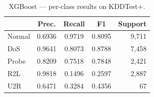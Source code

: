 \documentclass[conference, twocolumn]{IEEEtran}
\begin{document}
\begin{table}[!ht]
\centering
\caption{XGBoost --- per-class results on KDDTest+.}
\label{tab:xgb-pc}
\begin{tabular}{lcccr}
\toprule
        & Prec. & Recall & F1 & Support \\
\midrule
Normal  & 0.6936 & 0.9719 & 0.8095 & 9{,}711 \\
DoS     & 0.9641 & 0.8073 & 0.8788 & 7{,}458 \\
Probe   & 0.8209 & 0.7518 & 0.7848 & 2{,}421 \\
R2L     & 0.9818 & 0.1496 & 0.2597 & 2{,}887 \\
U2R     & 0.6471 & 0.3284 & 0.4356 &      67 \\
\bottomrule
\end{tabular}
\end{table}

\end{document}
